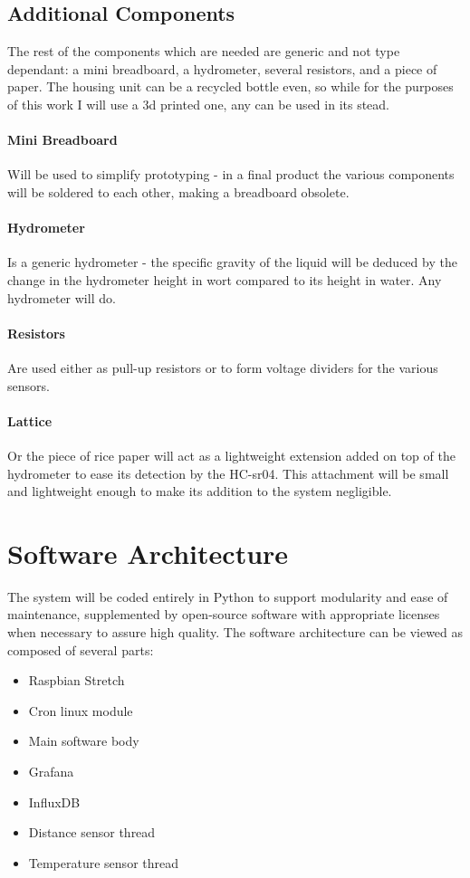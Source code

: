 \documentclass[twoside]{ctuthesis}
\theoremstyle{plain}
\theoremstyle{definition}
\theoremstyle{note}
\begin{document}
\subsection{Additional Components}
The rest of the components which are needed are generic and not type dependant: a mini breadboard, a hydrometer, several resistors, and a piece of paper. The housing unit can be a recycled bottle even, so while for the purposes of this work I will use a 3d printed one, any can be used in its stead.\\
\paragraph{Mini Breadboard} Will be used to simplify prototyping - in a final product the various components will be soldered to each other, making a breadboard obsolete.
\paragraph{Hydrometer} Is a generic hydrometer - the specific gravity of the liquid will be deduced by the change in the hydrometer height in wort compared to its height in water. Any hydrometer will do.
\paragraph{Resistors} Are used either as pull-up resistors or to form voltage dividers for the various sensors.
\paragraph{Lattice} Or the piece of rice paper will act as a lightweight extension added on top of the hydrometer to ease its detection by the HC-sr04. This attachment will be small and lightweight enough to make its addition to the system negligible.
\newpage
\section{Software Architecture}
The system will be coded entirely in Python to support modularity and ease of maintenance, supplemented by open-source software with appropriate licenses when necessary to assure high quality. The software architecture can be viewed as composed of several parts:\\

\begin{itemize}
	\item Raspbian Stretch
	\item Cron linux module
	\item Main software body
	\item Grafana 
	\item InfluxDB
	\item Distance sensor thread
	\item Temperature sensor thread
\end{itemize}
\end{document}
